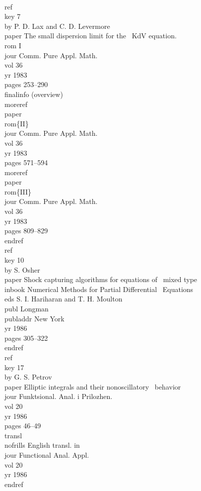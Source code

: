 \beginexample{\exindent=0pt}
\\ref\\key 7
\\by P. D. Lax and C. D. Levermore
\\paper The small dispersion limit for the
\ KdV equation.~\\rom I
\\jour Comm. Pure Appl. Math. \\vol 36 \\yr 1983
\\pages 253--290 \\finalinfo (overview)
\\moreref\\paper \\rom\{II\}
\\jour Comm. Pure Appl. Math.
\\vol 36 \\yr 1983 \\pages 571--594
\\moreref\\paper \\rom\{III\}
\\jour Comm. Pure Appl. Math.
\\vol 36 \\yr 1983 \\pages 809--829 \\endref
\ {}
\\ref\\key 10 \\by S. Osher
\\paper Shock capturing algorithms for equations of
\ mixed type
\\inbook Numerical Methods for Partial Differential
\ Equations \\eds S. I. Hariharan and T. H. Moulton
\\publ Longman \\publaddr New York \\yr 1986
\\pages 305--322
\\endref
\ {}
\\ref\\key 17 \\by G. S. Petrov
\\paper Elliptic integrals and their nonoscillatory
\ behavior
\\jour Funktsional. Anal. i Prilozhen.
\\vol 20 \\yr 1986 \\pages 46--49
\\transl\\nofrills English transl. in
\\jour Functional Anal. Appl. \\vol 20\\yr 1986
\\endref
\endexample


